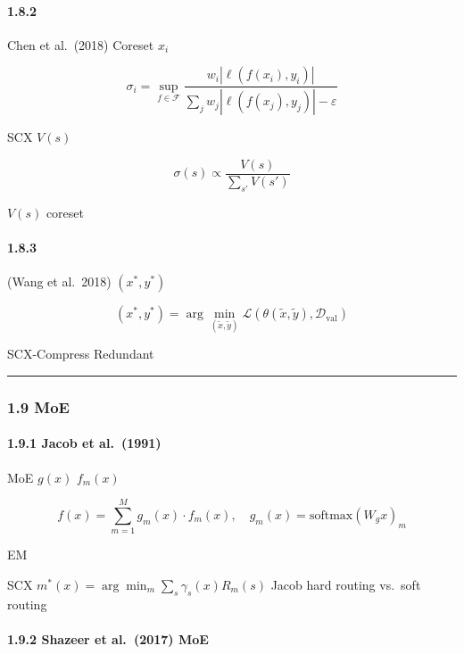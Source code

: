 \documentclass[
  12pt,
]{article}
\begin{document}
\paragraph{1.8.2 }\label{ux654fux611fux5ea6ux91c7ux6837}

Chen et al.~(2018)  Coreset  \(x_i\)


\[\sigma_i = \sup_{f \in \mathcal{F}} \frac{w_i |\ell(f(x_i), y_i)|}{\sum_{j} w_j |\ell(f(x_j), y_j)| - \varepsilon}\]

SCX  \(V(s)\) 

\[\sigma(s) \propto \frac{V(s)}{\sum_{s'} V(s')}\]

 \(V(s)\)  coreset 

\paragraph{1.8.3 }\label{ux6570ux636eux96c6ux84b8ux998f}

 (Wang et al.~2018)  \((x^*, y^*)\)


\[(x^*, y^*) = \arg\min_{(\tilde{x}, \tilde{y})} \mathcal{L}(\theta(\tilde{x}, \tilde{y}), \mathcal{D}_{\text{val}})\]

SCX-Compress  Redundant


\begin{center}\rule{0.5\linewidth}{0.5pt}\end{center}

\subsubsection{1.9 MoE
}\label{ux4e13ux5bb6ux8defux7531moe-ux8c31ux7cfb}

\paragraph{1.9.1 Jacob et al.~(1991)
}\label{jacob-et-al.-1991-ux81eaux9002ux5e94ux6df7ux5408ux4e13ux5bb6}

 MoE  \(g(x)\)  \(f_m(x)\)


\[f(x) = \sum_{m=1}^M g_m(x) \cdot f_m(x), \quad g_m(x) = \text{softmax}(W_g x)_m\]

 EM 

SCX  \(m^*(x) = \arg\min_m \sum_s \gamma_s(x) R_m(s)\)
 Jacob hard routing vs.~soft routing

\paragraph{1.9.2 Shazeer et al.~(2017) 
MoE}\label{shazeer-et-al.-2017-ux7a00ux758fux95e8ux63a7-moe}
\end{document}
